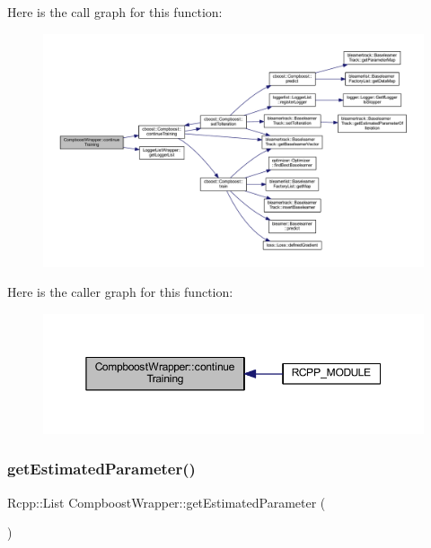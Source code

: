 Here is the call graph for this function\+:\nopagebreak
\begin{figure}[H]
\begin{center}
\leavevmode
\includegraphics[width=350pt]{class_compboost_wrapper_afd9b7f389a02a13c72a7e9a834594c73_cgraph}
\end{center}
\end{figure}
Here is the caller graph for this function\+:\nopagebreak
\begin{figure}[H]
\begin{center}
\leavevmode
\includegraphics[width=350pt]{class_compboost_wrapper_afd9b7f389a02a13c72a7e9a834594c73_icgraph}
\end{center}
\end{figure}
\mbox{\label{class_compboost_wrapper_ad31a5a5e70ceee981a14834a8fd52a68}} 
\subsubsection{\texorpdfstring{get\+Estimated\+Parameter()}{getEstimatedParameter()}}
{\footnotesize\ttfamily Rcpp\+::\+List Compboost\+Wrapper\+::get\+Estimated\+Parameter (\begin{DoxyParamCaption}{ }\end{DoxyParamCaption})\hspace{0.3cm}{\ttfamily [inline]}}

